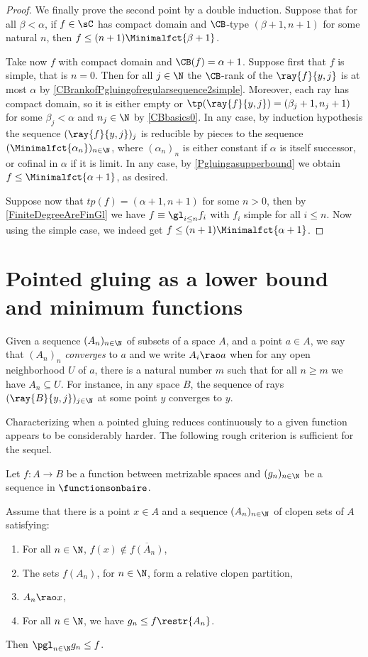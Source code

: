 \begin{proof}
\smallskip

We finally prove the second point by a double induction. Suppose that for all $\beta<\alpha$, if $f\in \sC$ has compact domain and $\CB$-type $(\beta+1,n+1)$
for some natural $n$, then $f\leq(n+1)\Minimalfct{\beta+1}$.

Take now $f$ with compact domain and $\CB(f)=\alpha+1$. Suppose first that $f$ is simple, that is $n=0$.
Then for all $j\in \N$ the $\CB$-rank of the $\ray{f}{y,j}$ is at most $\alpha$ by \cref{CBrankofPgluingofregularsequence2simple}.
Moreover, each ray has compact domain, so it is either empty or $\tp(\ray{f}{y,j})=(\beta_j+1,n_j+1)$ for some $\beta_j<\alpha$ and $n_j\in\N$ by \cref{CBbasics0}.
In any case, by induction hypothesis the sequence $(\ray{f}{y,j})_j$ is reducible by pieces to the sequence
$(\Minimalfct{\alpha_n})_{n\in\N}$, where $(\alpha_n)_n$ is either constant if $\alpha$ is itself successor, or cofinal in $\alpha$ if it is limit.
In any case, by \cref{Pgluingasupperbound} we obtain $f\leq\Minimalfct{\alpha+1}$, as desired.

Suppose now that $tp(f)=(\alpha+1,n+1)$ for some $n>0$, then by \cref{FiniteDegreeAreFinGl} we have $f\equiv\gl_{i\leq n}f_i$ with $f_i$ simple for all $i\leq n$.
Now using the simple case, we indeed get $f\leq (n+1)\Minimalfct{\alpha+1}$.
\end{proof}



\section{Pointed gluing as a lower bound and minimum functions}

Given a sequence $(A_n)_{n\in\N}$ of subsets of a space $A$, and a point $a\in A$, we say that $(A_n)_n$ \emph{converges} to $a$ and we write $A_i\rao a$
when for any open neighborhood $U$ of $a$, there is a natural number $m$ such that for all $n\geq m$ we have $A_n\subseteq U$. For instance, in any space $B$, the sequence of rays $(\ray{B}{y,j})_{j\in \N}$ at some point $y$ converges to $y$.

Characterizing when a pointed gluing reduces continuously to a given function appears to be considerably harder. The following rough criterion is sufficient for the sequel.


\begin{lemma}\label{Pgluingaslowerbound}
Let $f:A\to B$ be a function between metrizable spaces and $(g_n)_{n\in\N}$ be a sequence in $\functionsonbaire$.

Assume that there is a point $x\in A$ and a sequence $(A_n)_{n\in\N}$ of clopen sets of $A$ satisfying:
\begin{enumerate}
\item For all $n\in\N$, $f(x)\notin \overline{f(A_n)}$, 
\item The sets $f(A_n)$, for $n\in\N$, form a relative clopen partition, 
\item $A_n\rao x$,
\item For all $n\in\N$, we have $g_n\leq f\restr{A_n}$.
\end{enumerate}
Then $\pgl_{n\in \N}g_n\leq f$.
\end{lemma}

